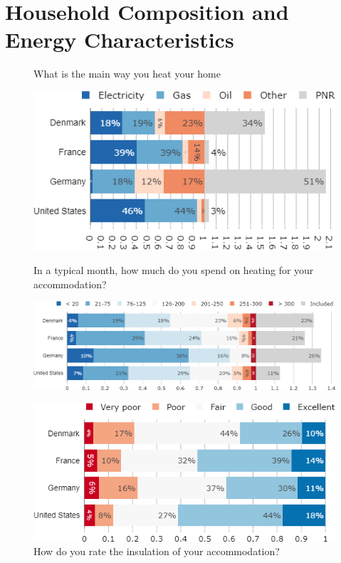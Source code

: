 \documentclass[aspectratio=169,9pt,dvipsnames]{beamer}
\begin{document}
\section{Household Composition and Energy Characteristics}
\begin{frame}{}%
\begin{figure}[h!]
\caption{What is the main way you heat your home}

\centering
\includegraphics[width=.5\textwidth]{../figures/country_comparison/heating_countries.png} \\
\vspace{.5cm}
\caption{In a typical month, how much do you spend on heating for your accommodation?}
\includegraphics[width=.7\textwidth]{../figures/country_comparison/heating_expenses_countries.png} \\
\vspace{.5cm}
\centering
\caption{How do you rate the insulation of your accommodation?}
\includegraphics[width=.6\textwidth]{../figures/country_comparison/insulation_countries.png}
\end{figure}
\end{frame}
\end{document}
